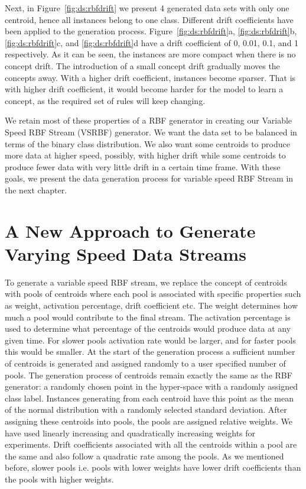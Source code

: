 Next, in Figure~\ref{fig:ds:rbfdrift} we present 4 generated data sets with only one centroid, hence all instances belong to one class. Different drift coefficients have been applied to the generation process. Figure~\ref{fig:ds:rbfdrift}a, \ref{fig:ds:rbfdrift}b, \ref{fig:ds:rbfdrift}c, and \ref{fig:ds:rbfdrift}d have a drift coefficient of 0, 0.01, 0.1, and 1 respectively. As it can be seen, the instances are more compact when there is no concept drift. The introduction of a small concept drift gradually moves the concepts away. With a higher drift coefficient, instances become sparser. That is with higher drift coefficient, it would become harder for the model to learn a concept, as the required set of rules will keep changing.

We retain most of these properties of a RBF generator in creating our Variable Speed RBF Stream (VSRBF) generator. We want the data set to be balanced in terms of the binary class distribution. We also want some centroids to produce more data at higher speed, possibly, with higher drift while some centroids to produce fewer data with very little drift in a certain time frame. With these goals, we present the data generation process for variable speed RBF Stream in the next chapter.

\section{A New Approach to Generate Varying Speed Data Streams}
To generate a variable speed RBF stream, we replace the concept of centroids with pools of centroids where each pool is associated with specific properties such as weight, activation percentage, drift coefficient etc. The weight determines how much a pool would contribute to the final stream. The activation percentage is used to determine what percentage of the centroids would produce data at any given time. For slower pools activation rate would be larger, and for faster pools this would be smaller. At the start of the generation process a sufficient number of centroids is generated and assigned randomly to a user specified number of pools. The generation process of centroids remain exactly the same as the RBF generator: a randomly chosen point in the hyper-space with a randomly assigned class label. Instances generating from each centroid have this point as the mean of the normal distribution with a randomly selected standard deviation. After assigning these centroids into pools, the pools are assigned relative weights. We have used linearly increasing and quadratically increasing weights for experiments. Drift coefficients associated with all the centroids within a pool are the same and also follow a quadratic rate among the pools. As we mentioned before, slower pools i.e. pools with lower weights have lower drift coefficients than the pools with higher weights.

